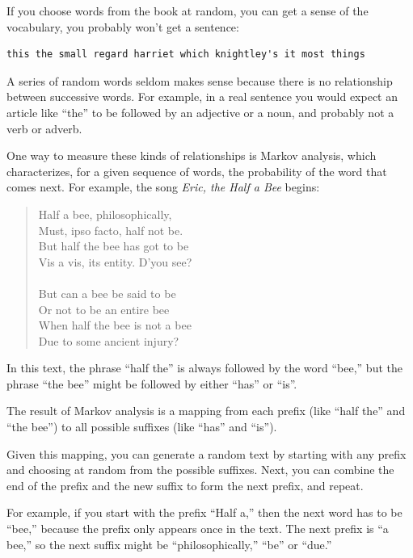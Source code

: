\documentclass[10pt]{book}
\begin{document}
If you choose words from the book at random, you can get a
sense of the vocabulary, you probably won't get a sentence:

\begin{verbatim}
this the small regard harriet which knightley's it most things
\end{verbatim}
%
A series of random words seldom makes sense because there
is no relationship between successive words.  For example, in
a real sentence you would expect an article like ``the'' to
be followed by an adjective or a noun, and probably not a verb
or adverb.

One way to measure these kinds of relationships is Markov
analysis, which
characterizes, for a given sequence of words, the probability of the
word that comes next.  For example, the song {\em Eric, the Half a
  Bee} begins:

\begin{quote}
Half a bee, philosophically, \\
Must, ipso facto, half not be. \\
But half the bee has got to be \\
Vis a vis, its entity. D'you see? \\
\\
But can a bee be said to be \\
Or not to be an entire bee \\
When half the bee is not a bee \\
Due to some ancient injury? \\
\end{quote}
%
In this text,
the phrase ``half the'' is always followed by the word ``bee,''
but the phrase ``the bee'' might be followed by either
``has'' or ``is''.

The result of Markov analysis is a mapping from each prefix
(like ``half the'' and ``the bee'') to all possible suffixes
(like ``has'' and ``is'').

Given this mapping, you can generate a random text by
starting with any prefix and choosing at random from the
possible suffixes.  Next, you can combine the end of the
prefix and the new suffix to form the next prefix, and repeat.

For example, if you start with the prefix ``Half a,'' then the
next word has to be ``bee,'' because the prefix only appears
once in the text.  The next prefix is ``a bee,'' so the
next suffix might be ``philosophically,'' ``be'' or ``due.''
\end{document}
